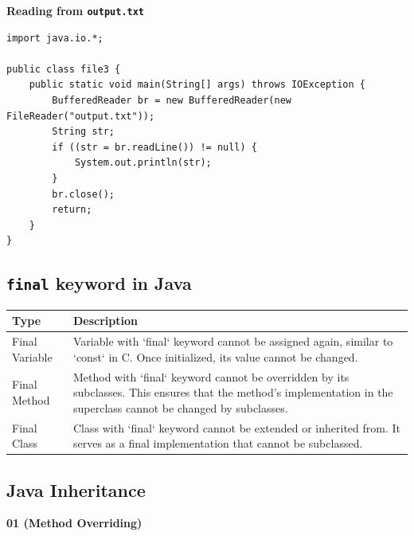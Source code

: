 \documentclass{book}
\begin{document}
\textbf{Reading from \texttt{output.txt}}

\begin{verbatim}
import java.io.*;

public class file3 {
    public static void main(String[] args) throws IOException {
        BufferedReader br = new BufferedReader(new FileReader("output.txt"));
        String str;
        if ((str = br.readLine()) != null) {
            System.out.println(str);
        }
        br.close();
        return;
    }
}
\end{verbatim}


\subsection{\texttt{final} keyword in Java}

\begin{center}
	\begin{tabular}{|l|p{10cm}|}
		\hline
		\textbf{Type}  & \textbf{Description}                                                                                                                                                 \\
		\hline
		Final Variable & Variable with `final` keyword cannot be assigned again, similar to `const` in C. Once initialized, its value cannot be changed.                                      \\
		\hline
		Final Method   & Method with `final` keyword cannot be overridden by its subclasses. This ensures that the method's implementation in the superclass cannot be changed by subclasses. \\
		\hline
		Final Class    & Class with `final` keyword cannot be extended or inherited from. It serves as a final implementation that cannot be subclassed.                                      \\
		\hline
	\end{tabular}
\end{center}

\subsection{Java Inheritance}

\textbf{01 (Method Overriding)}
\end{document}
